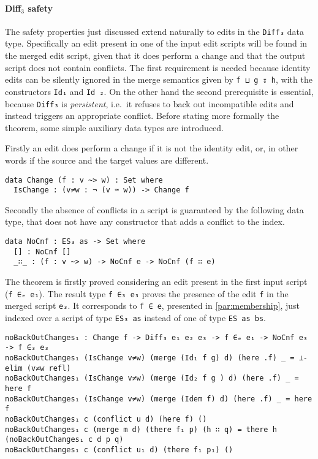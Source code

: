 \documentclass[../Thesis.tex]{subfiles}
\begin{document}
	\paragraph{Diff$_3$ safety}
	\label{par:diff3-safety}
	The safety properties just discussed extend naturally to edits in the 
	\texttt{Diff₃} data type. Specifically an edit present in one of the input
	edit scripts will be found in the merged edit script, given that it does
	perform a change and that the output script does not contain conflicts.
	The first requirement is needed because identity edits can be silently 
	ignored in the merge semantics given by \texttt{f ⊔ g ↧ h}, with the
	constructors \texttt{Id₁} and \texttt{Id	₂}.
	On the other hand the second prerequisite is essential, because 
	\texttt{Diff₃} is \emph{persistent},
	i.e.\ it refuses to back out incompatible edits and instead triggers 
	an appropriate conflict.
	Before stating more formally the theorem, some simple auxiliary 
	data	types are introduced.

	Firstly an edit does perform a change if it is not the identity edit, or, in 
	other words	if the source and the target values are different.

\begin{verbatim}
data Change (f : v ~> w) : Set where
  IsChange : (v≠w : ¬ (v ≃ w)) -> Change f
\end{verbatim}

	Secondly the absence of conflicts in a script is guaranteed by 
	the following data type, that does not have any constructor that adds
	a conflict to the index.

\begin{verbatim}	
data NoCnf : ES₃ as -> Set where
  [] : NoCnf []
  _∷_ : (f : v ~> w) -> NoCnf e -> NoCnf (f ∷ e)
\end{verbatim}
			
	The theorem is firstly proved considering an edit present in
	the first input script (\texttt{f ∈ₑ e₁}).
	The result type \texttt{f ∈₃ e₃} proves the presence of the edit \texttt{f}
	in the merged script \texttt{e₃}. 
	It corresponds to \texttt{f ∈ e}, presented in 
	\ref{par:membership}, just indexed over a script of type \texttt{ES₃ as}
	instead of one of 	type \texttt{ES as bs}.
	
\begin{verbatim}
noBackOutChanges₁ : Change f -> Diff₃ e₁ e₂ e₃ -> f ∈ₑ e₁ -> NoCnf e₃ -> f ∈₃ e₃
noBackOutChanges₁ (IsChange v≠w) (merge (Id₁ f g) d) (here .f) _ = ⊥-elim (v≠w refl)
noBackOutChanges₁ (IsChange v≠w) (merge (Id₂ f g ) d) (here .f) _ = here f
noBackOutChanges₁ (IsChange v≠w) (merge (Idem f) d) (here .f) _ = here f
noBackOutChanges₁ c (conflict u d) (here f) ()
noBackOutChanges₁ c (merge m d) (there f₁ p) (h ∷ q) = there h (noBackOutChanges₁ c d p q)
noBackOutChanges₁ c (conflict u₁ d) (there f₁ p₁) ()
\end{verbatim}
\end{document}
